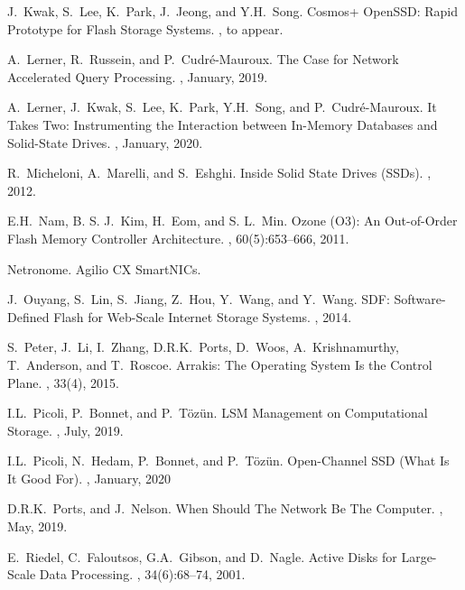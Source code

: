 \documentclass[11pt,dvipdfmx]{article}
\begin{document}
\begin{thebibliography}{10}
\begin{small}
 J.~Kwak, S.~Lee, K.~Park, J.~Jeong, and Y.H.~Song.
  \newblock Cosmos+ OpenSSD: Rapid Prototype for Flash Storage Systems.
  , to appear.

 A.~Lerner, R.~Russein, and P.~Cudr\'e-Mauroux.
  \newblock The Case for Network Accelerated Query Processing.
  , January, 2019.

 A.~Lerner, J.~Kwak, S.~Lee, K.~Park, Y.H.~Song, and P.~Cudr\'e-Mauroux.
  \newblock It Takes Two: Instrumenting the Interaction between In-Memory Databases and Solid-State Drives.
  , January, 2020.

 R.~Micheloni, A.~Marelli, and S.~Eshghi.
  \newblock Inside Solid State Drives (SSDs).
  , 2012.

 E.H.~Nam, B. S. J.~Kim, H.~Eom, and S. L.~Min.
  \newblock Ozone (O3): An Out-of-Order Flash Memory Controller Architecture.
  , 60(5):653--666, 2011.

 Netronome.
  \newblock Agilio CX SmartNICs.

 J.~Ouyang, S.~Lin, S.~Jiang, Z.~Hou, Y.~Wang, and Y.~Wang.
  \newblock SDF: Software-Defined Flash for Web-Scale Internet Storage Systems.
  , 2014.

 S.~Peter, J.~Li, I.~Zhang, D.R.K.~Ports, D.~Woos, A.~Krishnamurthy, T.~Anderson, and T.~Roscoe.
  \newblock Arrakis: The Operating System Is the Control Plane.
  , 33(4), 2015.

 I.L.~Picoli, P.~Bonnet, and P.~T\"oz\"un.
  \newblock LSM Management on Computational Storage.
  , July, 2019.

 I.L.~Picoli, N.~Hedam, P.~Bonnet, and P.~T\"oz\"un.
  \newblock Open-Channel SSD (What Is It Good For).
  , January, 2020

 D.R.K.~Ports, and J.~Nelson.
  \newblock When Should The Network Be The Computer.
  , May, 2019.

 E.~Riedel, C.~Faloutsos, G.A.~Gibson, and D.~Nagle.
  \newblock Active Disks for Large-Scale Data Processing.
  , 34(6):68--74, 2001.


\end{small}
\end{thebibliography}
\end{document}
